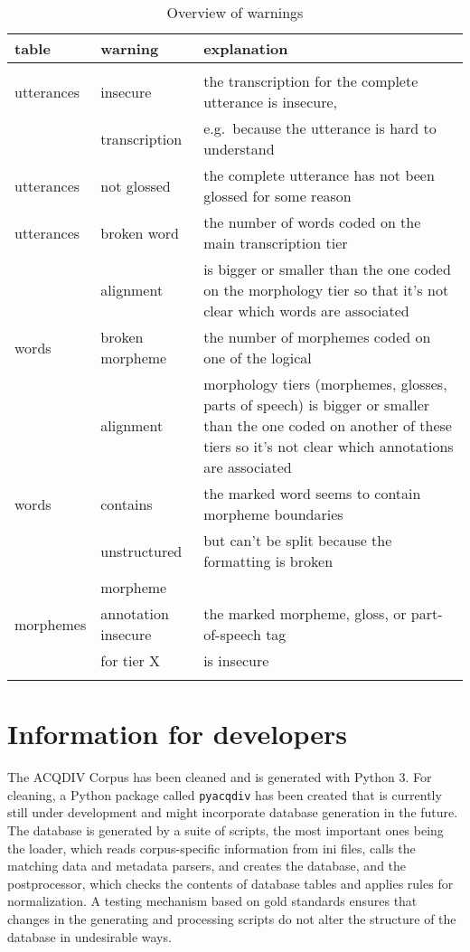 \documentclass[a4paper, 11pt]{book}
\begin{document}
\begin{longtable}{lp{.2\linewidth}p{.6\linewidth}}
	\toprule
		\textbf{table} & \textbf{warning} & \textbf{explanation} \\
	\midrule
	\endhead
	
	\bottomrule\\[-0.15cm]
	\caption{Overview of warnings}
	\endfoot
	
	utterances 		& insecure			 		& the transcription for the complete utterance is insecure, \\
					& transcription 			& e.g.\ because the utterance is hard to understand \\
	utterances		& not glossed				& the complete utterance has not been glossed for some reason \\
	utterances		& broken word			 	& the number of words coded on the main transcription tier \\
					& alignment	 				& is bigger or smaller than the one coded on the morphology tier so that it’s not clear which words are associated \\
	words			& broken morpheme 			& the number of morphemes coded on one of the logical \\
					& alignment 				& morphology tiers (morphemes, glosses, parts of speech) is bigger or smaller than the one coded on another of these tiers so it’s not clear which annotations are associated \\
	words			& contains	 				& the marked word seems to contain morpheme boundaries \\
					& unstructured 				& but can’t be split because the formatting is broken \\
					& morpheme 					& \\
	morphemes		& annotation insecure 		& the marked morpheme, gloss, or part-of-speech tag \\
					& for tier X				& is insecure \\[-0.3cm]
	
	\label{tab:Overview of warnings}
\end{longtable}



\chapter{Information for developers}
\label{cha:Information for developers}

The ACQDIV Corpus has been cleaned and is generated with Python 3. For cleaning, a Python package called \texttt{pyacqdiv} has been created that is currently still under development and might incorporate database generation in the future. The database is generated by a suite of scripts, the most important ones being the loader, which reads corpus-specific information from ini files, calls the matching data and metadata parsers, and creates the database, and the postprocessor, which checks the contents of database tables and applies rules for normalization. A testing mechanism based on gold standards ensures that changes in the generating and processing scripts do not alter the structure of the database in undesirable ways. 
\end{document}
